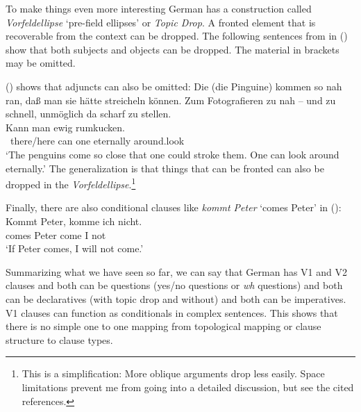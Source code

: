 To make things even more interesting German has a construction called \emph{Vorfeldellipse}
`pre-field ellipses' or \emph{Topic Drop}. A fronted element that is recoverable from the context
can be dropped. The following sentences from \citet{Huang84} in () show that both subjects and objects
can be dropped.
\eal
{}
\zl
The material in brackets may be omitted.

() shows that adjuncts can also be omitted:
\ea
Die (die Pinguine) kommen so nah ran, daß man sie hätte streicheln können. Zum Fotografieren
zu nah -- und zu schnell, unmöglich da scharf zu stellen.\\
\gll [Da/Hier] Kann man ewig rumkucken.\footnotemark\\
     ~there/here can one eternally around.look\\
\glt `The penguins come so close that one could stroke them. One can look around eternally.'
\z
The generalization is that things that can be fronted can also be dropped in the \emph{Vorfeldellipse}.\footnote{
        This is a simplification: More oblique arguments drop less easily. Space limitations
        prevent me from going into a detailed discussion, but see the cited references.%
}

Finally, there are also conditional clauses like \emph{kommt Peter} `comes Peter' in ():
\ea
\gll Kommt Peter, komme ich nicht.\\
     comes Peter  come  I not\\
\glt `If Peter comes, I will not come.'
\z

Summarizing what we have seen so far, we can say that German has V1 and V2 clauses and both can be
questions (yes/no questions or \emph{wh} questions) and both can be declaratives (with topic drop
and without) and both can be imperatives. V1 clauses can function as conditionals in complex
sentences. This shows that there is no simple one to one mapping from topological mapping or clause structure to clause types. 







